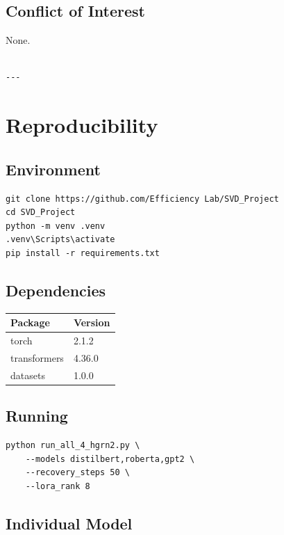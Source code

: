 \subsection{Conflict of Interest}

None.
\begin{lstlisting}

---
\end{lstlisting}

\section{Reproducibility}

\subsection{Environment}

\begin{lstlisting}
git clone https://github.com/Efficiency Lab/SVD_Project
cd SVD_Project
python -m venv .venv
.venv\Scripts\activate
pip install -r requirements.txt
\end{lstlisting}

\subsection{Dependencies}

\begin{table}[H]
\centering
\small
\begin{tabular}{ll}
\toprule
\textbf{Package} & \textbf{Version} \\
\midrule
torch & 2.1.2 \\
transformers & 4.36.0 \\
datasets & 1.0.0 \\
\bottomrule
\end{tabular}
\end{table}

\subsection{Running}

\begin{lstlisting}
python run_all_4_hgrn2.py \
    --models distilbert,roberta,gpt2 \
    --recovery_steps 50 \
    --lora_rank 8
\end{lstlisting}

\subsection{Individual Model}

